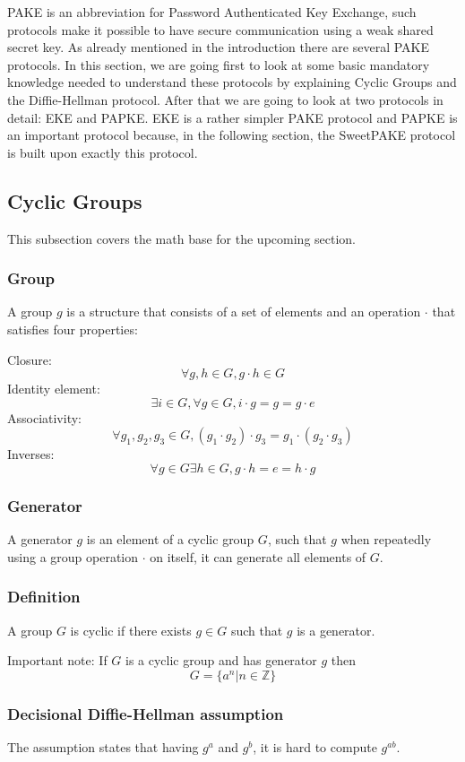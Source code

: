 \documentclass[../main.tex]{subfiles}
\begin{document}
PAKE is an abbreviation for Password Authenticated Key Exchange, such protocols
make it possible to have secure communication using a weak shared secret key.
As already mentioned in the introduction there are several PAKE protocols. In
this section, we are going first to look at some basic mandatory knowledge
needed to understand these protocols by explaining Cyclic Groups and the
Diffie-Hellman protocol. After that we are going to look at two protocols in
detail: EKE and PAPKE. EKE is a rather simpler PAKE protocol and PAPKE is an
important protocol because, in the following section, the SweetPAKE protocol is built upon exactly this protocol.

\subsection{Cyclic Groups}
This subsection covers the math base for the upcoming section.

\subsubsection{Group}
A group \(g\) is a structure that consists of a set of elements and an operation \(\cdot\)
that satisfies four properties: 

Closure: \[\forall g, h \in G,  g \cdot h \in G\]
Identity element: \[\exists i \in G, \forall g \in G, i \cdot g = g =
g \cdot e\]
Associativity: \[\forall g_1, g_2, g_3 \in G, (g_1 \cdot g_2) \cdot g_3 = g_1
\cdot (g_2 \cdot g_3)\]
Inverses:\[\forall g \in G \exists h \in G, g \cdot h = e = h \cdot g\]

\subsubsection{Generator}
A generator \(g\) is an element of a cyclic group \(G\), such that \(g\) when repeatedly using
a group operation \(\cdot\) on itself, it can generate all elements of \(G\).

\subsubsection{Definition} A group \(G\) is cyclic if there exists \(g \in G\)
such that \(g\) is a generator.

Important note: If \(G\) is a cyclic group and has generator \(g\) then \[G =
\{a^n | n \in \mathbb{Z}\}\]

\subsubsection{Decisional Diffie-Hellman assumption}
The assumption states that having \(g^{a}\) and \(g^{b}\), it is hard to compute \(g^{ab}\).
\end{document}
